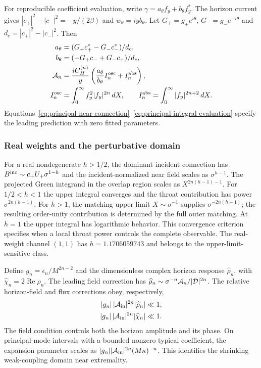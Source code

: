 For reproducible coefficient evaluation, write $\gamma=a_\theta f_y+
b_\theta f_y^*$.  The horizon current gives
$|c_+|^2-|c_-|^2=-y/(2\beta)$ and $w_\theta=iyb_\theta$.
Let $G_+=g_+e^{i\theta}$, $G_-=g_-e^{-i\theta}$ and
$d_c=|c_+|^2-|c_-|^2$.  Then
\begin{align}
a_\theta&=(G_+c_+^*-G_-c_-^*)/d_c,\nonumber\\
b_\theta&=(-G_+c_-+G_-c_+)/d_c,\nonumber\\
{\cal A}_n&=\frac{iC_H^{(n)}}{y}
\left(\frac{a_\theta}{b_\theta}I_n^{\rm osc}+I_n^{\rm abs}\right),\nonumber\\
I_n^{\rm osc}&=\int_0^\infty f_y^2|f_y|^{2n}\,dX,\qquad
I_n^{\rm abs}=\int_0^\infty|f_y|^{2n+2}\,dX.
\label{eq:principal-integral-evaluation}
\end{align}
Equations~\eqref{eq:principal-near-connection}--\eqref{eq:principal-integral-evaluation}
specify the leading prediction with zero fitted parameters.

\subsubsection{Real weights and the perturbative domain}

For a real nondegenerate $h>1/2$, the dominant incident connection has
$B^{\rm inc}\sim c_+U_+\sigma^{1-h}$ and the incident-normalized near
field scales as $\sigma^{h-1}$.  The projected Green integrand in the
overlap region scales as $X^{2n(h-1)-1}$.
For $1/2<h<1$ the upper integral converges and the throat contribution
has power $\sigma^{2n(h-1)}$.  For $h>1$, the matching upper limit
$X\sim\sigma^{-1}$ supplies $\sigma^{-2n(h-1)}$; the resulting
order-unity contribution is determined by the full outer matching.
At $h=1$ the upper integral has logarithmic behavior.
This convergence criterion specifies when a local throat power controls
the complete observable.  The real-weight channel $(1,1)$ has
$h=1.1706059743$ and belongs to the upper-limit-sensitive class.

Define $g_n=\epsilon_n/M^{2n-2}$ and the dimensionless complex horizon
response $\widehat\rho_n$, with
$\widehat\chi_n=2\operatorname{Re}\widehat\rho_n$.
The leading field correction has
$\widehat\rho_n\sim\sigma^{-n}{\cal A}_n/|{\cal D}|^{2n}$.
The relative horizon-field and flux corrections obey, respectively,
\begin{equation}
\begin{split}
|g_n|\,|{\cal A}_{\rm in}|^{2n}|\widehat\rho_n|&\ll1,\\
|g_n|\,|{\cal A}_{\rm in}|^{2n}|\widehat\chi_n|&\ll1.
\end{split}
\label{eq:principal-validity}
\end{equation}
The field condition controls both the horizon amplitude and its phase.
On principal-mode intervals with a bounded nonzero typical coefficient,
the expansion parameter scales as
$|g_n||{\cal A}_{\rm in}|^{2n}(M\kappa)^{-n}$.
This identifies the shrinking weak-coupling domain near extremality.

